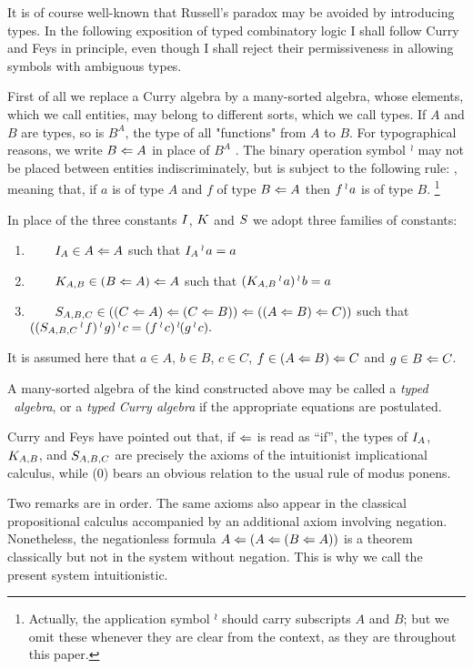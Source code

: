 It is of course well-known that Russell's paradox may be
avoided by introducing types. In the following exposition of
typed combinatory logic I shall follow Curry and Feys
in principle, even though I shall reject their permissiveness
in allowing symbols with ambiguous types.

First of all we replace a Curry algebra by a many-sorted algebra, whose elements,
which we call entities, may belong to different sorts, which we call types.
If $A$ and $B$ are types, so is $B^A$, the type of all "functions" from $A$ to $B$. For
typographical reasons, we write $B \Leftarrow A$ in place of $B^A$ . The
binary operation symbol $\mathop{{}^\wr}\kern-.8pt$ may not be placed between entities indiscriminately,
but is subject to the following rule:
\bes
{},
\ees
meaning that, if $a$ is of type $A$ and $f$ of type $B \Leftarrow A$ then
$f\mathop{{}^\wr}\kern-.8pt a$ is of type $B$.%
\footnote{Actually, the application symbol $\mathop{{}^\wr}\kern-.8pt$ should carry subscripts $A$ and $B$;
but we omit these whenever they are clear from the context, as they are throughout this paper.}

In place of the three constants ${I}$, ${K}$ and ${S}$ we adopt three families of constants:
\begin{enumerate}[align=left]
\item[(1)]$\qquad {I}_{A} \in A \Leftarrow A$ such that ${I}_{A} \mathop{{}^\wr}\kern-.8pt a = a$
\item[(2)]$\qquad {K}_{A,B} \in (B \Leftarrow A) \Leftarrow A$ such that $({K}_{A,B}\mathop{{}^\wr}\kern-.8pt a)\mathop{{}^\wr}\kern-.8pt b = a$
\item[(3)]$\qquad {S}_{A,B,C} \in ((C \Leftarrow A) \Leftarrow (C \Leftarrow B)) \Leftarrow ((A \Leftarrow B) \Leftarrow C))$ such that
$(({S}_{A,B,C} \mathop{{}^\wr}\kern-.8pt f) \mathop{{}^\wr}\kern-.8pt g) \mathop{{}^\wr}\kern-.8pt c = (f \mathop{{}^\wr}\kern-.8pt c) \mathop{{}^\wr}\kern-.8pt (g \mathop{{}^\wr}\kern-.8pt c).$
\end{enumerate}
It is assumed here that $a\in A$, $b \in B$, $c\in C$, $f \in (A \Leftarrow B) \Leftarrow C$ and $g \in B \Leftarrow C$.

A many-sorted algebra of the kind constructed above
may be called a {\it typed \schon\ algebra}, or a {\it typed Curry algebra} if the appropriate
equations are postulated.

Curry and Feys have pointed out that, if $\Leftarrow$ is read as ``if'',
the types of ${I}_{A}$, ${K}_{A,B}$, and ${S}_{A,B,C}$ are precisely the axioms of the
intuitionist implicational calculus, while (0) bears an obvious relation to
the usual rule of modus ponens.

Two remarks are in order. The same axioms also appear in the classical
propositional calculus accompanied by an additional axiom involving negation.
Nonetheless, the negationless formula $A \Leftarrow (A \Leftarrow (B \Leftarrow A))$ is a
theorem classically but not in the system without negation.
This is why we call the present system intuitionistic.

